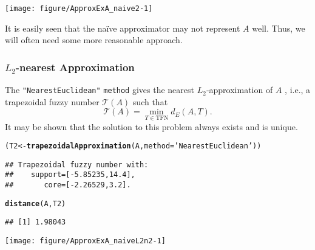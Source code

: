 \documentclass[11pt]{article}\usepackage[]{graphicx}\usepackage[]{color}
\makeatletter
\newcommand{\hlstr}[1]{\textcolor[rgb]{0.192,0.494,0.8}{#1}}%
\newcommand{\hlstd}[1]{\textcolor[rgb]{0.345,0.345,0.345}{#1}}%
\newcommand{\hlkwb}[1]{\textcolor[rgb]{0.69,0.353,0.396}{#1}}%
\newcommand{\hlkwc}[1]{\textcolor[rgb]{0.333,0.667,0.333}{#1}}%
\newcommand{\hlkwd}[1]{\textcolor[rgb]{0.737,0.353,0.396}{\textbf{#1}}}%
\newenvironment{kframe}{%
 \def\at@end@of@kframe{}%
 \ifinner\ifhmode%
  \def\at@end@of@kframe{\end{minipage}}%
  \begin{minipage}{\columnwidth}%
 \fi\fi%
 \def\FrameCommand##1{\hskip\@totalleftmargin \hskip-\fboxsep
 \colorbox{shadecolor}{##1}\hskip-\fboxsep
     \hskip-\linewidth \hskip-\@totalleftmargin \hskip\columnwidth}%
 \MakeFramed {\advance\hsize-\width
   \@totalleftmargin\z@ \linewidth\hsize
   \@setminipage}}%
 {\par\unskip\endMakeFramed%
 \at@end@of@kframe}
\newenvironment{knitrout}{}{} %
\newcommand{\argument}[1]{\texttt{\hlkwc{#1}}}
\newcommand{\str}[1]{\texttt{\hlstr{#1}}}
\makeatother
\begin{document}
\begin{center}
\begin{knitrout}\small
{}\color{fgcolor}

{\centering \texttt{[image: figure/ApproxExA\_naive2-1]} 

}



\end{knitrout}
\end{center}

It is easily seen that the na\"{i}ve approximator
may not represent $A$ well.
Thus, we will often need some more reasonable
approach.


\subsubsection{$L_2$-nearest Approximation}





The \str{"{}NearestEuclidean"{}} \argument{method}
gives the nearest $L_2$-approximation of $A$
\cite[Corollary 8]{Ban2009:nearestfnrev},
i.e., a trapezoidal fuzzy number $\mathcal{T}(A)$ such that
\[
\mathcal{T}(A)=\min\limits_{T\in \mathrm{TFN}}d_E(A,T).
\]
It may be shown that the solution to this problem
always exists and is unique.

\begin{knitrout}\small
{}\color{fgcolor}\begin{kframe}
\begin{alltt}
\hlstd{(T2} \hlkwb{<-} \hlkwd{trapezoidalApproximation}\hlstd{(A,} \hlkwc{method}\hlstd{=}\hlstr{'NearestEuclidean'}\hlstd{))}
\end{alltt}
\begin{verbatim}
## Trapezoidal fuzzy number with:
##    support=[-5.85235,14.4],
##       core=[-2.26529,3.2].
\end{verbatim}
\begin{alltt}
\hlkwd{distance}\hlstd{(A, T2)}
\end{alltt}
\begin{verbatim}
## [1] 1.98043
\end{verbatim}
\end{kframe}
\end{knitrout}

\begin{center}
\begin{knitrout}\small
{}\color{fgcolor}

{\centering \texttt{[image: figure/ApproxExA\_naiveL2n2-1]} 

}



\end{knitrout}
\end{center}
\end{document}
